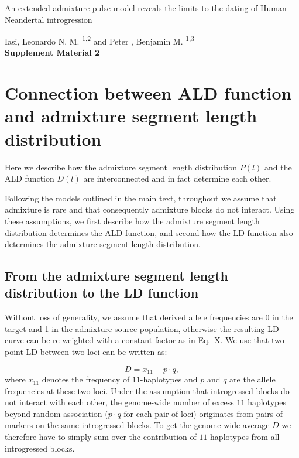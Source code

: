 \documentclass[11pt]{article}
\begin{document}
\begin{titlepage}


    \vspace*{1cm}
        
        
    \begin{center}       
        \large
        \vspace{1cm}
        An extended admixture pulse model reveals the limits to the dating of Human-Neandertal introgression
        
       \vspace{1.0cm}
        \large
        Iasi, Leonardo N. M. \textsuperscript{1,2} and Peter , Benjamin M. \textsuperscript{1,3} \\ 
        
        \vspace{1.0cm}
            \Huge
            \textbf{Supplement Material 2}
    \end{center} 

            

\end{titlepage}

\section{Connection between ALD function and admixture segment length distribution}

Here we describe how the admixture segment length distribution $P(l)$ and the ALD function $D(l)$ are interconnected and in fact determine each other.

Following the models outlined in the main text, throughout we assume that admixture is rare and that consequently admixture blocks do not interact. Using these assumptions, we first describe how the admixture segment length distribution determines the ALD function, and second how the LD function also determines the admixture segment length distribution.

\subsection{From the admixture segment length distribution to the LD function}
Without loss of generality, we assume that derived allele frequencies are 0 in the target and 1 in the admixture source population, otherwise the resulting LD curve can be re-weighted with a constant factor as in Eq.~X. We use that two-point LD between two loci can be written as: 

\begin{equation}
D = x_{11} - p \cdot q,
\end{equation}
where $x_{11}$ denotes the frequency of $11$-haplotypes and $p$ and $q$ are the allele frequencies at these two loci. Under the assumption that introgressed blocks do not interact with each other, the genome-wide number of excess $11$ haplotypes beyond random association ($p\cdot q$ for each pair of loci) originates from pairs of markers on the same introgressed blocks. To get the genome-wide average $D$ we therefore have to simply sum over the contribution of $11$ haplotypes from all introgressed blocks.
\end{document}
